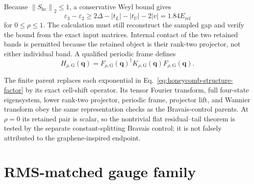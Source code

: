 \documentclass[11pt]{article}
\newcommand{\norm}[1]{\left\lVert #1\right\rVert}
\begin{document}
Because $\norm{S_{\mathrm{hc}}}_2\le1$, a conservative Weyl bound gives
\begin{equation}
 \varepsilon_3-\varepsilon_2
 \ge 2\Delta-|t_L|-|t_U|-2|v|=1.84E_{\mathrm{ref}}
 \label{eq:graphene-external-isolation-gap}
\end{equation}
for $0\le\rho\le1$.  The calculation must still reconstruct the sampled gap and verify
the bound from the exact input matrices.  Internal contact of the two retained bands is
permitted because the retained object is their rank-two projector, not either individual
band.  A qualified periodic frame defines
\begin{equation}
 H_{\rho,\mathrm G}(\mathbf q)
 =F_{\rho,\mathrm G}(\mathbf q)^\dagger
  K_{\rho,\mathrm G}(\mathbf q)F_{\rho,\mathrm G}(\mathbf q).
\end{equation}

The finite parent replaces each exponential in
Eq.~\eqref{eq:honeycomb-structure-factor} by its exact cell-shift operator.  Its tensor
Fourier transform, full four-state eigensystem, lower rank-two projector, periodic frame,
projector lift, and Wannier transform obey the same representation checks as the
Bravais-control parents.  At $\rho=0$ its retained pair is scalar, so the nontrivial flat
residual--tail theorem is tested by the separate constant-splitting Bravais control; it
is not falsely attributed to the graphene-inspired endpoint.

\section{RMS-matched gauge family}
\end{document}
